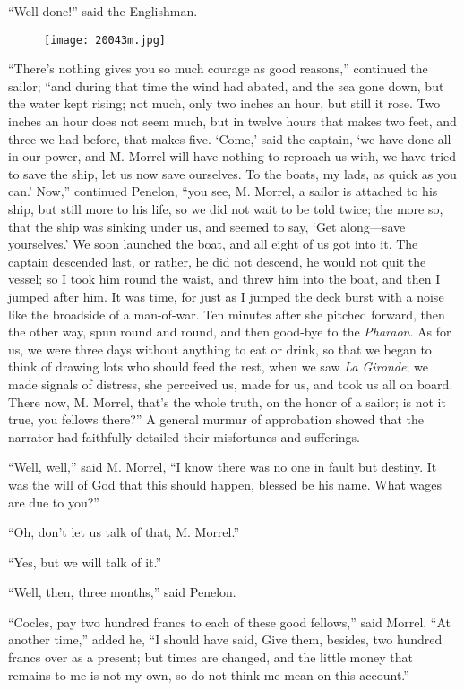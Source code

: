 “Well done!” said the Englishman.

\begin{figure}[ht]
\texttt{[image: 20043m.jpg]}
\end{figure}

“There’s nothing gives you so much courage as good reasons,” continued
the sailor; “and during that time the wind had abated, and the sea gone
down, but the water kept rising; not much, only two inches an hour, but
still it rose. Two inches an hour does not seem much, but in twelve
hours that makes two feet, and three we had before, that makes five.
‘Come,’ said the captain, ‘we have done all in our power, and M. Morrel
will have nothing to reproach us with, we have tried to save the ship,
let us now save ourselves. To the boats, my lads, as quick as you can.’
Now,” continued Penelon, “you see, M. Morrel, a sailor is attached to
his ship, but still more to his life, so we did not wait to be told
twice; the more so, that the ship was sinking under us, and seemed to
say, ‘Get along—save yourselves.’ We soon launched the boat, and all
eight of us got into it. The captain descended last, or rather, he did
not descend, he would not quit the vessel; so I took him round the
waist, and threw him into the boat, and then I jumped after him. It was
time, for just as I jumped the deck burst with a noise like the
broadside of a man-of-war. Ten minutes after she pitched forward, then
the other way, spun round and round, and then good-bye to the
\textit{Pharaon}. As for us, we were three days without anything to eat or
drink, so that we began to think of drawing lots who should feed the
rest, when we saw \textit{La Gironde}; we made signals of distress, she
perceived us, made for us, and took us all on board. There now, M.
Morrel, that’s the whole truth, on the honor of a sailor; is not it
true, you fellows there?” A general murmur of approbation showed that
the narrator had faithfully detailed their misfortunes and sufferings.

“Well, well,” said M. Morrel, “I know there was no one in fault but
destiny. It was the will of God that this should happen, blessed be his
name. What wages are due to you?”

“Oh, don’t let us talk of that, M. Morrel.”

“Yes, but we will talk of it.”

“Well, then, three months,” said Penelon.

“Cocles, pay two hundred francs to each of these good fellows,” said
Morrel. “At another time,” added he, “I should have said, Give them,
besides, two hundred francs over as a present; but times are changed,
and the little money that remains to me is not my own, so do not think
me mean on this account.”

